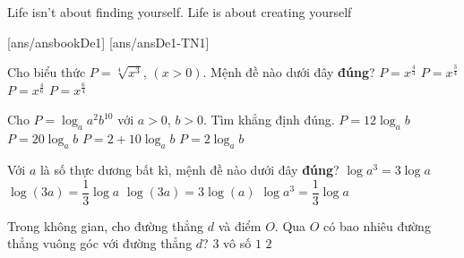\begin{name}
	{\tenchude}
	{\tendethi}
	{\tentruong}
	{Life isn’t about finding yourself. Life is about creating yourself}
\end{name}
[ans/ansbookDe1]
\TN
{}[ans/ansDe1-TN1]\begin{ex}%
Cho biểu thức $P=\sqrt[4]{x^3}$, $(x>0)$. Mệnh đề nào dưới đây \textbf{đúng}?
\choice
{$P=x^{\frac{4}{3}}$}
{\True $P=x^{\frac{3}{4}}$}
{$P=x^{\frac{4}{6}}$}
{$P=x^{\frac{6}{4}}$}
\end{ex}

\begin{ex}%
Cho $P = \log_{a}a^2b^{10}$ với $a>0$, $b>0$. Tìm khẳng định đúng.
\choice
{$P = 12\log_{a}b$}
{$P = 20\log_{a}b$}
{\True $P = 2 + 10\log_{a}b$}
{$P = 2\log_{a}b$}
\end{ex}

\begin{ex}%
Với $a$ là số thực dương bất kì, mệnh đề nào dưới đây \textbf{đúng}?
\choice
{\True $\log a^3=3\log a$}
{$\log (3a)=\dfrac{1}{3} \log a$}
{$\log (3a)=3\log (a)$}
{$\log a^3=\dfrac{1}{3} \log a$}
\end{ex}

\begin{ex}%
Trong không gian, cho đường thẳng $d$ và điểm $O$. Qua $O$ có bao nhiêu đường thẳng vuông góc với đường thẳng $d$?
\choice
{$3$}
{\True vô số}
{$1$}
{$2$}
\end{ex}

